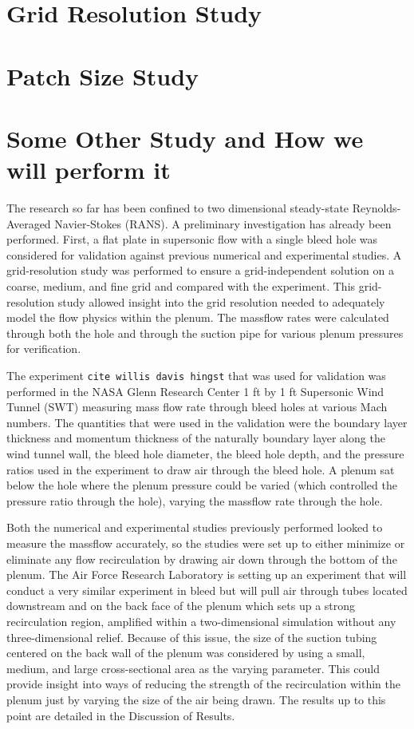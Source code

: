 
\section{Grid Resolution Study}

\section{Patch Size Study}

\section{Some Other Study and How we will perform it}


The research so far has been confined to two dimensional steady-state Reynolds-Averaged Navier-Stokes (RANS). A preliminary investigation has already been performed. First, a flat plate in supersonic flow with a single bleed hole was considered for validation against previous numerical and experimental studies. A grid-resolution study was performed to ensure a grid-independent solution on a coarse, medium, and fine grid and compared with the experiment.  This grid-resolution study allowed insight into the grid resolution needed to adequately model the flow physics within the plenum. The massflow rates were calculated through both the hole and through the suction pipe for various plenum pressures for verification.

The experiment \verb|cite willis davis hingst| that was used for validation was performed in the NASA Glenn Research Center 1 ft by 1 ft Supersonic Wind Tunnel (SWT) measuring mass flow rate through bleed holes at various Mach numbers. The quantities that were used in the validation were the boundary layer thickness and momentum thickness of the naturally boundary layer along the wind tunnel wall, the bleed hole diameter, the bleed hole depth, and the pressure ratios used in the experiment to draw air through the bleed hole. A plenum sat below the hole where the plenum pressure could be varied (which controlled the pressure ratio through the hole), varying the massflow rate through the hole.

Both the numerical and experimental studies previously performed looked to measure the massflow accurately, so the studies were set up to either minimize or eliminate any flow recirculation by drawing air down through the bottom of the plenum. The Air Force Research Laboratory is setting up an experiment that will conduct a very similar experiment in bleed but will pull air through tubes located downstream and on the back face of the plenum which sets up a strong recirculation region, amplified within a two-dimensional simulation without any three-dimensional relief. Because of this issue, the size of the suction tubing centered on the back wall of the plenum was considered by using a small, medium, and large cross-sectional area as the varying parameter. This could provide insight into ways of reducing the strength of the recirculation within the plenum just by varying the size of the air being drawn. The results up to this point are detailed in the Discussion of Results.

